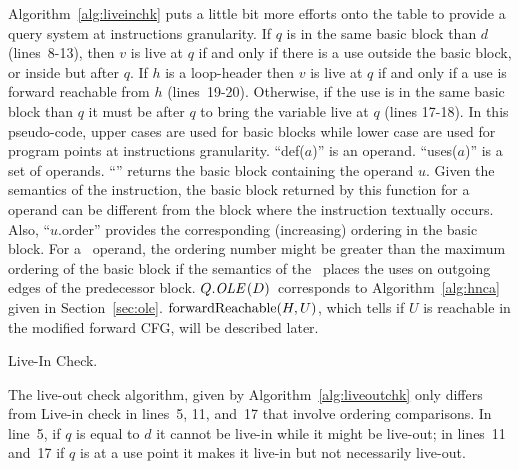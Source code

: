 Algorithm~\ref{alg:liveinchk} puts a little bit more efforts onto the table to provide a query system at instructions granularity.
If $q$ is in the same basic block than $d$ (lines~8-13), then $v$ is live at $q$ if and only if there is a use outside the basic block, or inside but after $q$.
If $h$ is a loop-header then $v$ is live at $q$ if and only if a use is forward reachable from $h$ (lines~19-20).
Otherwise, if the use is in the same basic block than $q$ it must be after $q$ to bring the variable live at $q$ (lines 17-18).
In this pseudo-code, upper cases are used for basic blocks while lower case are used for program points at instructions granularity.
``def($a$)'' is an operand.
``uses($a$)'' is a set of operands.
``'' returns the basic block containing the operand $u$.
Given the semantics of the \phifun instruction, the basic block returned by this function for a \phifun operand can be different from the block where the instruction textually occurs.
Also, ``$u$.order'' provides the corresponding (increasing) ordering in the basic block.
For a \phifun\ operand, the ordering number might be greater than the maximum ordering of the basic block if the semantics of the \phifun\ places the uses on outgoing edges of the predecessor block.
$Q.\textit{OLE}\,(D)$\ corresponds to Algorithm~\ref{alg:hnca} given in Section~\ref{sec:ole}.
$\textrm{{forward}Reachable}(H,U)$, which tells if $U$ is reachable in the modified forward CFG, will be described later.

\begin{algorithm}
\caption{Live-In Check.}
\label{alg:liveinchk}
\end{algorithm}

The live-out check algorithm, given by Algorithm~\ref{alg:liveoutchk} only differs from Live-in check in lines~5, 11, and~17 that involve ordering comparisons.
In line~5, if $q$ is equal to $d$ it cannot be live-in while it might be live-out; in lines~11 and~17 if $q$ is at a use point it makes it live-in but not necessarily live-out.

